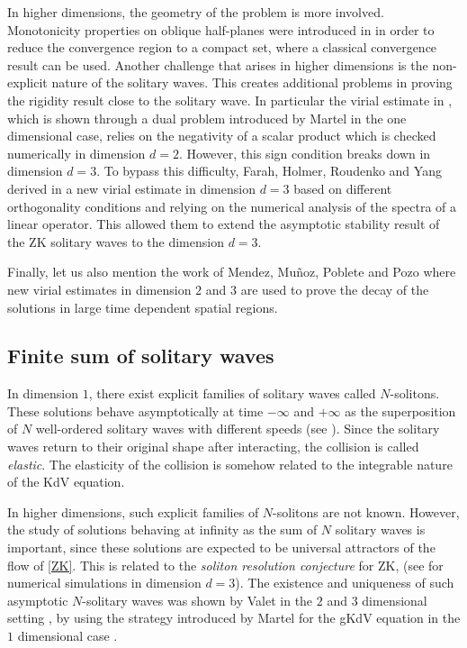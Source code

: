 \documentclass[reqno,10pt]{amsart}
\numberwithin{equation}{section}
\begin{document}
	In higher dimensions, the geometry of the problem is more involved. Monotonicity properties on oblique half-planes were introduced in \cite{CMPS16} in order to reduce the convergence region to a compact set, where a classical convergence result can be used. 
	Another challenge that arises in higher dimensions is the non-explicit nature of the solitary waves. This creates additional problems in proving the rigidity result close to the solitary wave. In particular the virial estimate in \cite{CMPS16}, which is shown through a dual problem introduced by Martel \cite{MA06} in the one dimensional case, relies on the negativity of a scalar product which is checked numerically in dimension $d=2$. However, this sign condition breaks down in dimension $d=3$. To bypass this difficulty, Farah, Holmer, Roudenko and Yang derived in \cite{FHRY23} a new virial estimate in dimension $d=3$ based on different orthogonality conditions and relying on the numerical analysis of the spectra of a linear operator. This allowed them to extend the asymptotic stability result of the ZK solitary waves to the dimension $d=3$. 
 
 Finally, let us also mention the work of Mendez, Mu\~noz, Poblete and Pozo \cite{MMPP21} where new virial estimates in dimension $2$ and $3$ are used to prove the decay of the solutions in large time dependent spatial regions.
	
	\subsection{Finite sum of solitary waves}
	
	In dimension $1$, there exist explicit families of solitary waves called $N$-solitons. These solutions behave asymptotically at time $-\infty$ and $+\infty$ as the  superposition of $N$ well-ordered solitary waves with different speeds (see \cite{Miura76}). Since the solitary waves return to their original shape after interacting, the collision is called \emph{elastic}. The elasticity of the collision is somehow related to the integrable nature of the KdV equation.
	
	In higher dimensions, such explicit families of $N$-solitons are not known. However, the study of solutions behaving at infinity as the sum of $N$ solitary waves is important, since these solutions are expected to be universal attractors of the flow of \eqref{ZK}. This is related to the \emph{soliton resolution conjecture} for ZK, (see \cite{KRS21} for numerical simulations in dimension $d=3$). The existence and uniqueness of such asymptotic $N$-solitary waves was shown by Valet in the $2$ and $3$ dimensional setting \cite{Va21}, by using the strategy introduced by Martel for the gKdV equation in the $1$ dimensional case \cite{Ma05}. 
	
\end{document}
